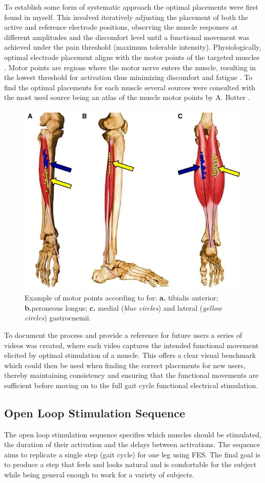To establish some form of systematic approach the optimal placements were first found in myself. This involved iteratively adjusting the placement of both the active and reference electrode positions, observing the muscle responses at different amplitudes and the discomfort level until a functional movement was achieved under the pain threshold (maximum tolerable intensity). Physiologically, optimal electrode placement aligns with the motor points of the targeted muscles \cite{gobbo_muscle_2014}. Motor points are regions where the motor nerve enters the muscle, resulting in the lowest threshold for activation thus minimizing discomfort and fatigue \cite{gobbo_muscle_2014}. To find the optimal placements for each muscle several sources were consulted with the most used source being an atlas of the muscle motor points by A. Botter \cite{botter_atlas_2011}. 

\begin{figure}
    \centering
    \includegraphics[width=0.6\linewidth]{images/screenshotmotorpoint.png}
    \caption{Example of motor points according to \cite{botter_atlas_2011} for: \textbf{a.} tibialis anterior; \textbf{b.}peroneous longus; \textbf{c.} medial (\textit{blue circles}) and lateral (\textit{yellow circles}) gastrocnemii. }
    \label{fig:motor-points}
\end{figure}

To document the process and provide a reference for future users a series of videos was created, where each video captures the intended functional movement elicited by optimal stimulation of a muscle. This offers a clear visual benchmark which could then be used when finding the correct placements for new users, thereby maintaining consistency and ensuring that the functional movements are sufficient before moving on to the full gait cycle functional electrical stimulation.

\subsection{Open Loop Stimulation Sequence}
The open loop stimulation sequence specifies which muscles should be stimulated, the duration of their activation and the delays between activations. The sequence aims to replicate a single step (gait cycle) for one leg using FES. The final goal is to produce a step that feels and looks natural and is comfortable for the subject while being general enough to work for a variety of subjects.

